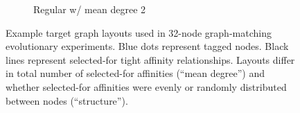 \begin{figure}[!htbp]
\begin{center}
\begin{minipage}{0.95\textwidth}
\begin{minipage}{\textwidth}
\begin{minipage}{0.95\linewidth}
\begin{subfigure}[b]{0.5\textwidth}
\caption{
Regular w/ mean degree 2
}
\label{fig:regular_degree_2}
\label{fig:regular_2}
\end{subfigure}
\end{minipage}
\end{minipage}
\end{minipage}

\caption{
Example target graph layouts used in 32-node graph-matching evolutionary experiments.
Blue dots represent tagged nodes.
Black lines represent selected-for tight affinity relationships.
Layouts differ in total number of selected-for affinities (``mean degree'') and whether selected-for affinities were evenly or randomly distributed between nodes (``structure'').
}
\label{fig:graph_layouts}


\end{center}
\end{figure}
